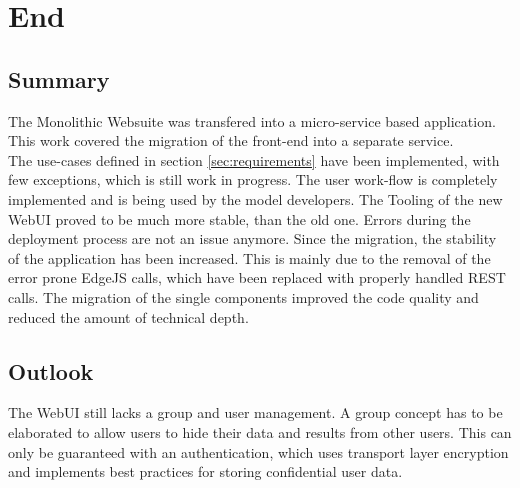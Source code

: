 
\chapter{End}



\section{Summary}
The Monolithic Websuite was transfered into a micro-service based application. This work covered the migration of the front-end into a separate service.\\
The use-cases defined in section \ref{sec:requirements} have been implemented, with few exceptions,  which is still work in progress. The user work-flow is completely implemented and is being used by the model developers. The Tooling of the new WebUI proved to be much more stable, than the old one. Errors during the deployment process are not an issue anymore. Since the migration, the stability of the application has been increased. This is mainly due to the removal of the error prone EdgeJS calls, which have been replaced with properly handled REST calls. The migration of the single components improved the code quality and reduced the amount of technical depth.



\section{Outlook}
The WebUI still lacks a group and user management. A group concept has to be elaborated to allow users to hide their data and results from other users. This can only be guaranteed with an authentication, which uses transport layer encryption and implements best practices for storing confidential user data.
